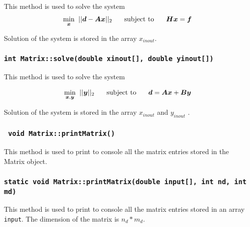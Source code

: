 \documentclass[a4paper]{article}
\begin{document}
This method is used to solve the system 
\begin{equation*}
\begin{aligned}
\underset{\boldsymbol{x}}{\min} \hspace{0.2cm} ||\boldsymbol{d} - \boldsymbol{A}\boldsymbol{x} ||_{2}  \hspace{0.5cm} \text{ subject to } \hspace{0.5cm}   \boldsymbol{H}\boldsymbol{x} = \boldsymbol{f}
\end{aligned}
\end{equation*}

Solution of the system is stored in the array $x_{inout}$.

 
\subsubsection{\texttt{int Matrix::solve(double xinout[], double yinout[])}}
 
This method is used to solve the system 
 

\begin{equation*}
\begin{aligned}
\underset{\boldsymbol{x},\boldsymbol{y}}{\min} \hspace{0.2cm} || \boldsymbol{y} ||_{2}  \hspace{0.5cm} \text{ subject to } \hspace{0.5cm}  \boldsymbol{d}  = \boldsymbol{A} \boldsymbol{x} + \boldsymbol{B} \boldsymbol{y}
\end{aligned}
\end{equation*}

 
 Solution of the system is stored in the array $x_{inout}$ and $y_{inout}$ .


\subsubsection{\texttt{ void Matrix::printMatrix()}}

This method is used to print to console all the matrix entries stored in the Matrix object. 


\subsubsection{\texttt{static void Matrix::printMatrix(double input[], int nd, int md)}}

This method is used to print to console all the matrix entries stored in an array \texttt{input}. The dimension of the matrix is $n_{d}*m_{d}$.
\end{document}

